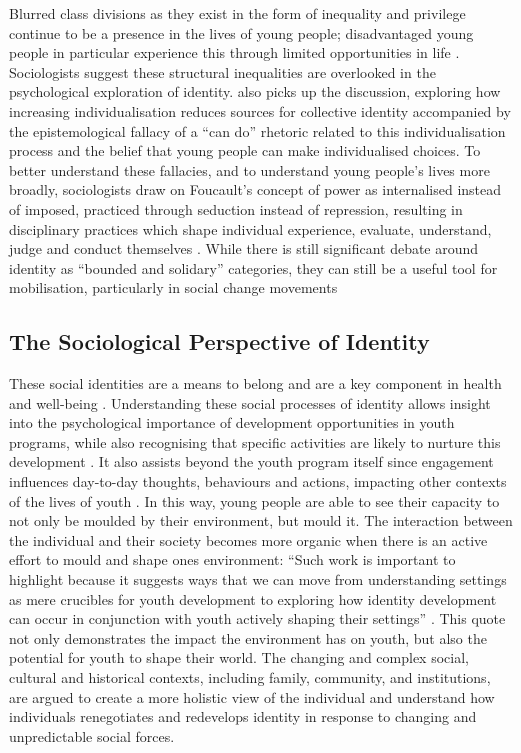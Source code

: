 Blurred class divisions as they exist in the form of inequality and privilege continue to be a presence in the lives of young people; disadvantaged young people in particular experience this through limited opportunities in life \citep{Stokes2015}. Sociologists suggest these structural inequalities are overlooked in the psychological exploration of identity. \citet{Beck1992} also picks up the discussion, exploring how increasing individualisation reduces sources for collective identity accompanied by the epistemological fallacy of a “can do” rhetoric related to this individualisation process and the belief that young people can make individualised choices. To better understand these fallacies, and to understand young people's lives more broadly, sociologists draw on Foucault's concept of power as internalised instead of imposed, practiced through seduction instead of repression, resulting in disciplinary practices which shape individual experience, evaluate, understand, judge and conduct themselves \citep{Stokes2015}. While there is still significant debate around identity as “bounded and solidary” categories, they can still be a useful tool for mobilisation, particularly in social change movements \citep{Stokes2015,Brubaker2000}

\subsection{The Sociological Perspective of Identity}

\label{IdentitySoc}
These social identities are a means to belong and are a key component in health and well-being \citep{Futch2016}. Understanding these social processes of identity allows insight into the psychological importance of development opportunities in youth programs, while also recognising that specific activities are likely to nurture this development \citep{Futch2016}. It also assists beyond the youth program itself since engagement influences day-to-day thoughts, behaviours and actions, impacting other contexts of the lives of youth \citep{Futch2016}. In this way, young people are able to see their capacity to not only be moulded by their environment, but mould it. The interaction between the individual and their society becomes more organic when there is an active effort to mould and shape ones environment: “Such work is important to highlight because it suggests ways that we can move from understanding settings as mere crucibles for youth development to exploring how identity development can occur in conjunction with youth actively shaping their settings” \citep[][p677]{Futch2016}. This quote not only demonstrates the impact the environment has on youth, but also the potential for youth to shape their world. The changing and complex social, cultural and historical contexts, including family, community, and institutions, are argued to create a more holistic view of the individual and understand how individuals renegotiates and redevelops identity in response to changing and unpredictable social forces. 


